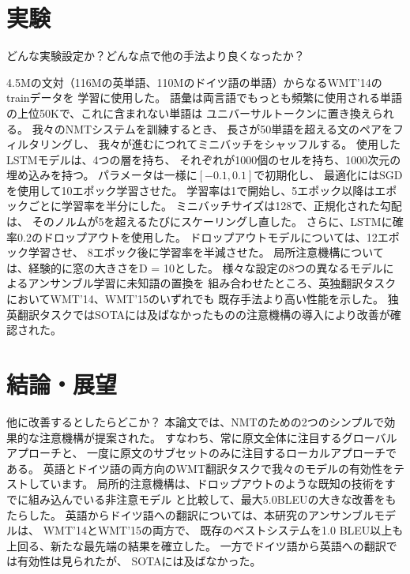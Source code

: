 \documentclass{jsarticle}
\begin{document}
\section{実験}
どんな実験設定か？どんな点で他の手法より良くなったか？

4.5Mの文対（116Mの英単語、110Mのドイツ語の単語）からなるWMT'14のtrainデータを
学習に使用した。
語彙は両言語でもっとも頻繁に使用される単語の上位50Kで、これに含まれない単語は
ユニバーサルトークンに置き換えられる。
我々のNMTシステムを訓練するとき、
長さが50単語を超える文のペアをフィルタリングし、
我々が進むにつれてミニバッチをシャッフルする。
使用したLSTMモデルは、4つの層を持ち、
それぞれが1000個のセルを持ち、1000次元の埋め込みを持つ。
パラメータは一様に$[-0.1, 0.1]$で初期化し、
最適化にはSGDを使用して10エポック学習させた。
学習率は1で開始し、5エポック以降はエポックごとに学習率を半分にした。
ミニバッチサイズは128で、正規化された勾配は、
そのノルムが5を超えるたびにスケーリングし直した。
さらに、LSTMに確率0.2のドロップアウトを使用した。
ドロップアウトモデルについては、12エポック学習させ、
8エポック後に学習率を半減させた。
局所注意機構については、経験的に窓の大きさをD = 10とした。
様々な設定の8つの異なるモデルによるアンサンブル学習に未知語の置換を
組み合わせたところ、英独翻訳タスクにおいてWMT’14、WMT’15のいずれでも
既存手法より高い性能を示した。
独英翻訳タスクではSOTAには及ばなかったものの注意機構の導入により改善が確認された。

\section{結論・展望}
他に改善するとしたらどこか？
本論文では、NMTのための2つのシンプルで効果的な注意機構が提案された。
すなわち、常に原文全体に注目するグローバルアプローチと、
一度に原文のサブセットのみに注目するローカルアプローチである。
英語とドイツ語の両方向のWMT翻訳タスクで我々のモデルの有効性をテストしています。
局所的注意機構は、ドロップアウトのような既知の技術をすでに組み込んでいる非注意モデル
と比較して、最大5.0BLEUの大きな改善をもたらした。
英語からドイツ語への翻訳については、本研究のアンサンブルモデルは、
WMT'14とWMT'15の両方で、
既存のベストシステムを1.0 BLEU以上も上回る、新たな最先端の結果を確立した。
一方でドイツ語から英語への翻訳では有効性は見られたが、
SOTAには及ばなかった。


\end{document}
